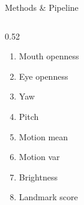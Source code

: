 \documentclass[aspectratio=169]{beamer}
\begin{document}
\begin{frame}{Methods \& Pipeline}
\begin{columns}[T]
\begin{column}{0.52\textwidth}
      \vspace{0.2em}
      \begin{enumerate}
        \item Mouth openness
        \item Eye openness
        \item Yaw
        \item Pitch
        \item Motion mean
        \item Motion var
        \item Brightness
        \item Landmark score
      \end{enumerate}

    \end{column}
  \end{columns}


\end{frame}
\end{document}
